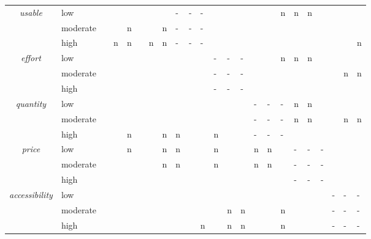 \begin{table}
\begin{center}
\begin{tabularx}{\columnwidth}{cl|X|X|X|X|X|X|X|X|X|X|X|X|X|X|X|X|X|X|X|X|X|}
            \multirow{3}{*}{\textit{usable}}        & low       &   &   &   &   &   &   & - & - & - &   &   &   &   &   & n & n & n &   &   &   &   \\ \cline{2-23}
                                                    & moderate  &   &   & n &   &   & n & - & - & - &   &   &   &   &   &   &   &   &   &   &   &   \\ \cline{2-23}
                                                    & high      &   & n & n &   & n & n & - & - & - &   &   &   &   &   &   &   &   &   &   &   & n \\ \hline

            \multirow{3}{*}{\textit{effort}}        & low       &   &   &   &   &   &   &   &   &   & - & - & - &   &   & n & n & n &   &   &   &   \\ \cline{2-23}
                                                    & moderate  &   &   &   &   &   &   &   &   &   & - & - & - &   &   &   &   &   &   &   & n & n \\ \cline{2-23}
                                                    & high      &   &   &   &   &   &   &   &   &   & - & - & - &   &   &   &   &   &   &   &   &   \\ \hline

            \multirow{3}{*}{\textit{quantity}}      & low       &   &   &   &   &   &   &   &   &   &   &   &   & - & - & - & n & n &   &   &   &   \\ \cline{2-23}
                                                    & moderate  &   &   &   &   &   &   &   &   &   &   &   &   & - & - & - & n & n &   &   & n & n \\ \cline{2-23}
                                                    & high      &   &   & n &   &   & n & n &   &   & n &   &   & - & - & - &   &   &   &   &   &   \\ \hline

            \multirow{3}{*}{\textit{price}}         & low       &   &   & n &   &   & n & n &   &   & n &   &   & n & n &   & - & - & - &   &   &   \\ \cline{2-23}
                                                    & moderate  &   &   &   &   &   & n & n &   &   & n &   &   & n & n &   & - & - & - &   &   &   \\ \cline{2-23}
                                                    & high      &   &   &   &   &   &   &   &   &   &   &   &   &   &   &   & - & - & - &   &   &   \\ \hline

            \multirow{3}{*}{\textit{accessibility}} & low       &   &   &   &   &   &   &   &   &   &   &   &   &   &   &   &   &   &   & - & - & - \\ \cline{2-23}
                                                    & moderate  &   &   &   &   &   &   &   &   &   &   & n & n &   &   & n &   &   &   & - & - & - \\ \cline{2-23}
                                                    & high      &   &   &   &   &   &   &   &   & n &   & n & n &   &   & n &   &   &   & - & - & - \\ \hline
        

\end{tabularx}
\end{center}
\end{table}
